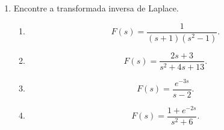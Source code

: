 \documentclass[10pt,a4paper]{amsart}
\begin{document}
\begin{enumerate}
    \item Encontre a transformada inversa de Laplace.

    \begin{enumerate}
        \item 
        \[
        F(s)=\frac{1}{(s+1)(s^2-1)}.
        \]

        \item 
        \[
        F(s)=\frac{2s+3}{s^2+4s+13}.
        \]

        \item 
        \[
        F(s)=\frac{e^{-3s}}{s-2}.
        \]

        \item 
        \[
        F(s)=\frac{1+e^{-2s}}{s^2+6}.
        \]
    \end{enumerate}
\end{enumerate}
\end{document}

